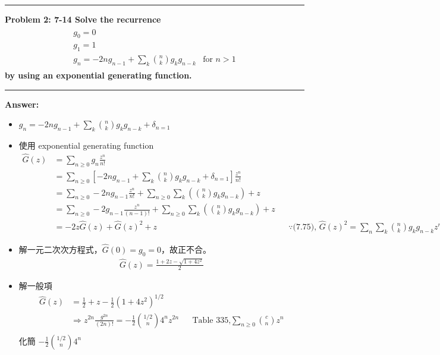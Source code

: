 \documentclass[11pt,fleqn]{article}
\newcommand\question[2]{\vspace{.25in}\hrule\textbf{#1: #2}\vspace{.5em}\hrule\vspace{.10in}}
\renewcommand\part[1]{\vspace{.10in}\textbf{#1}}
\begin{document}
\question{Problem 2} {7-14 Solve the recurrence
	\begin{align*}
	\begin{matrix}
	g_0 = 0 & \\ 
	g_1 = 1 & \\
 	g_n = -2n g_{n-1} + \sum_{k} \binom{n}{k} g_k g_{n-k} & \text{for } n > 1
	\end{matrix}
	\end{align*}
	by using an exponential generating function.
}

\part{Answer:}

\begin{itemize}
	\item $g_n = -2n g_{n-1} + \sum_{k} \binom{n}{k} g_k g_{n-k} + \delta_{n=1}$
	\item 使用 exponential generating function
		\begin{align*}
			\widehat{G}(z) 
				&= \sum_{n \ge 0} g_n \frac{z^n}{n!} \\
				&= \sum_{n \ge 0} \left [ -2n g_{n-1} + \sum_{k} \binom{n}{k} g_k g_{n-k} + \delta_{n=1} \right ] \frac{z^n}{n!} \\
				&= \sum_{n \ge 0} -2n g_{n-1} \frac{z^n}{n!} + \sum_{n \ge 0} \sum_{k} \left ( \binom{n}{k} g_k g_{n-k} \right ) + z \\
				&= \sum_{n \ge 0} -2 g_{n-1} \frac{z^n}{(n-1)!} + \sum_{n \ge 0} \sum_{k} \left ( \binom{n}{k} g_k g_{n-k} \right ) + z\\
				&= -2 z \widehat{G}(z) + \widehat{G}(z)^2 + z 
				&& \because \text{(7.75), } \widehat{G}(z)^2 = \sum_n \sum_k \binom{n}{k} g_k g_{n-k} z^n
		\end{align*}
	\item 解一元二次次方程式，$\widehat{G}(0)= g_0 = 0$，故正不合。
		\begin{align*}
			\widehat{G}(z) = \frac{1+2z-\sqrt{1+4z^2}}{2}
		\end{align*}
	\item 解一般項 
		\begin{align*}
			\widehat{G}(z) &= \frac{1}{2} + z - \frac{1}{2}(1+4z^2)^{1/2} \\
			& \Rightarrow z^{2n} \frac{g^{2n}}{(2n)!} = - \frac{1}{2} \binom{1/2}{n} 4^n z^{2n} 
				&& \text{Table 335,} \sum_{n \ge 0} \binom{c}{n} z^n \\
		\end{align*}
		化簡 $- \frac{1}{2} \binom{1/2}{n} 4^n$

\end{itemize}
\end{document}
